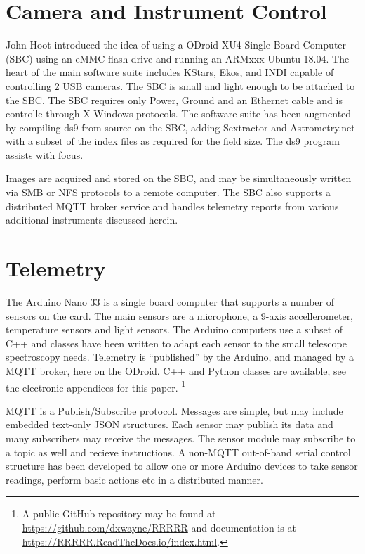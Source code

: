 \documentclass[letter,11pt,oneside]{article}
\newcommand{\ltodo}[2]{\marginpar{\textcolor{red}{ACTION: #1}\endnote{#2}}}
\begin{document}
\section{Camera and Instrument Control}

John Hoot \cite{} introduced the idea of using a ODroid XU4 Single
Board Computer (SBC) using an eMMC flash drive and running an ARMxxx
Ubuntu 18.04. The heart of the main software suite includes KStars,
Ekos, and INDI capable of controlling 2 USB cameras.  The SBC is small
and light enough to be attached to the SBC.  The SBC requires only
Power, Ground and an Ethernet cable and is controlle through X-Windows
protocols. The software suite has been augmented by compiling ds9
\cite{} from source on the SBC, adding Sextractor \cite{} and
Astrometry.net \cite{} with a subset of the index files as required
for the field size. The ds9 program assists with focus.

Images are acquired and stored on the SBC, and may be simultaneously
written via SMB or NFS protocols to a remote computer. The
SBC also supports a distributed MQTT broker service and handles
telemetry reports from various additional instruments discussed
herein.


\ltodo{XU4 Processor}{Get the description of ODroid together}

\section{Telemetry}

The Arduino Nano 33 is a single board computer that supports a number
of sensors on the card. The main sensors are a microphone, a 9-axis
accellerometer, temperature sensors and light sensors.  The Arduino
computers use a subset of C++ and classes have been written to adapt
each sensor to the small telescope spectroscopy needs. Telemetry is
``published'' by the Arduino, and managed by a MQTT broker, here on
the ODroid. C++ and Python classes are available, see the electronic
appendices for this paper. \footnote{A public GitHub repository may be
  found at \url{https://github.com/dxwayne/RRRRR} and documentation is
  at \url{https://RRRRR.ReadTheDocs.io/index.html}.}

MQTT \cite{} is a Publish/Subscribe protocol. Messages are simple,
but may include embedded text-only JSON structures. Each sensor
may publish its data and many subscribers may receive the messages.
The sensor module may subscribe to a topic as well and recieve
instructions. A non-MQTT out-of-band serial control structure has
been developed to allow one or more Arduino devices to take sensor
readings, perform basic actions etc in a distributed manner.
\end{document}
